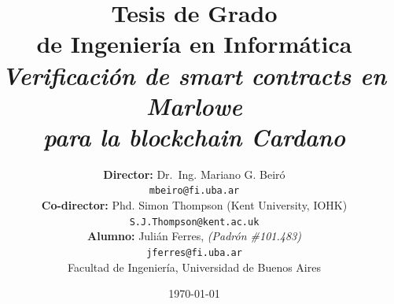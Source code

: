 \documentclass[12pt]{book}
\begin{document}
\begin{titlepage}

	\title{     \textbf{Tesis de Grado \\ de Ingeniería en Informática}\\[2.5ex]
		\textit{Verificación de smart contracts en Marlowe\\ para la blockchain Cardano}}

	\author{
		\textbf{Director:} Dr.\ Ing. Mariano G. Beiró \\
		\texttt{mbeiro@fi.uba.ar}\\[2.5ex]
		\textbf{Co-director:} Phd. Simon Thompson (Kent University, IOHK) \\
		\texttt{S.J.Thompson@kent.ac.uk}
		\\[2.5ex]
		\textbf{Alumno:} Julián Ferres, \textit{(Padrón \#101.483)}                                \\
		\texttt{ jferres@fi.uba.ar }                                    \\[2.5ex]
		\normalsize{Facultad de Ingeniería, Universidad de Buenos Aires}        \\
	}
	\date{\today}

\end{titlepage}

\maketitle
\thispagestyle{empty}

\maketitle

{
	\hypersetup{linkcolor=black}
	\tableofcontents
}


\end{document}

